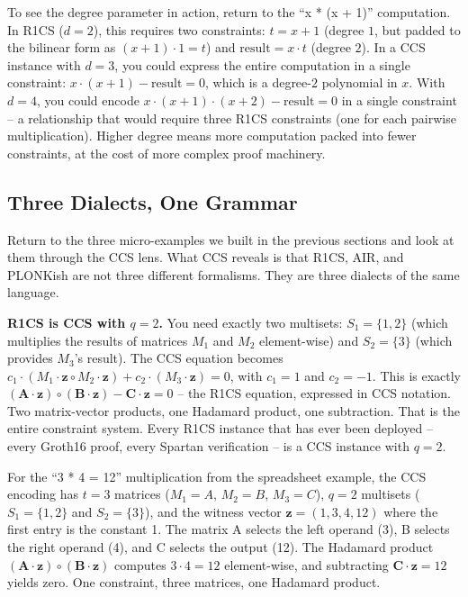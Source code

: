 \documentclass[
  11pt,
  openany]{report}
\renewcommand{\textbf}[1]{{\bfseries\color{MidnightBold}#1}}
\begin{document}
To see the degree parameter in action, return to the ``x * (x + 1)''
computation. In R1CS (\(d = 2\)), this requires two constraints: \(t = x + 1\)
(degree \(1\), but padded to the bilinear form as \((x + 1) \cdot 1 = t\)) and
\(\text{result} = x \cdot t\) (degree \(2\)). In a CCS instance with \(d = 3\),
you could express the entire computation in a single constraint:
\(x \cdot (x + 1) - \text{result} = 0\), which is a degree-\(2\) polynomial in
\(x\). With \(d = 4\), you could encode
\(x \cdot (x + 1) \cdot (x + 2) - \text{result} = 0\) in a single constraint --
a relationship that would require three R1CS constraints (one for each pairwise
multiplication). Higher degree means more computation packed into fewer
constraints, at the cost of more complex proof machinery.

\subsection{Three Dialects, One Grammar}\label{three-dialects-one-grammar}

Return to the three micro-examples we built in the previous sections and look at
them through the CCS lens. What CCS reveals is that R1CS, AIR, and PLONKish are
not three different formalisms. They are three dialects of the same language.

\textbf{R1CS is CCS with \(q = 2\).} You need exactly two multisets:
\(S_1 = \{1, 2\}\) (which multiplies the results of matrices \(M_1\) and \(M_2\)
element-wise) and \(S_2 = \{3\}\) (which provides \(M_3\)'s result). The CCS
equation becomes
\(c_1 \cdot (M_1 \cdot \mathbf{z} \circ M_2 \cdot \mathbf{z}) + c_2 \cdot (M_3 \cdot \mathbf{z}) = 0\),
with \(c_1 = 1\) and \(c_2 = -1\). This is exactly
\((\mathbf{A} \cdot \mathbf{z}) \circ (\mathbf{B} \cdot \mathbf{z}) - \mathbf{C} \cdot \mathbf{z} = 0\)
-- the R1CS equation, expressed in CCS notation. Two matrix-vector products, one
Hadamard product, one subtraction. That is the entire constraint system. Every
R1CS instance that has ever been deployed -- every Groth16 proof, every Spartan
verification -- is a CCS instance with \(q = 2\).

For the ``3 * 4 = 12'' multiplication from the spreadsheet example, the CCS
encoding has \(t = 3\) matrices (\(M_1 = A\), \(M_2 = B\), \(M_3 = C\)),
\(q = 2\) multisets (\(S_1 = \{1, 2\}\) and \(S_2 = \{3\}\)), and the witness
vector \(\mathbf{z} = (1, 3, 4, 12)\) where the first entry is the constant 1.
The matrix A selects the left operand (3), B selects the right operand (4), and
C selects the output (12). The Hadamard product
\((\mathbf{A} \cdot \mathbf{z}) \circ (\mathbf{B} \cdot \mathbf{z})\) computes
\(3 \cdot 4 = 12\) element-wise, and subtracting
\(\mathbf{C} \cdot \mathbf{z} = 12\) yields zero. One constraint, three
matrices, one Hadamard product.
\end{document}
